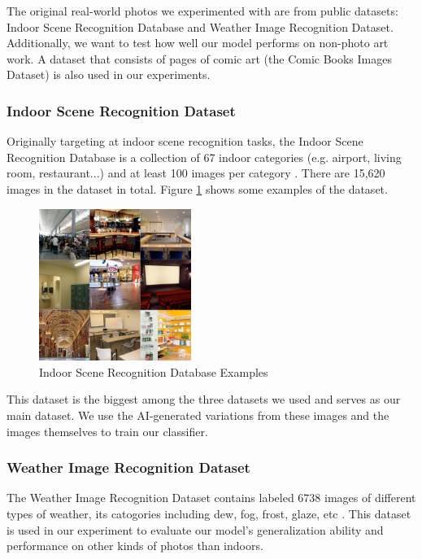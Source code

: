 \documentclass[11pt]{article}
\begin{document}
The original real-world photos we experimented with are from public datasets: Indoor Scene Recognition Database and Weather Image Recognition Dataset. Additionally, we want to test how well our model performs on non-photo art work. A dataset that consists of pages of comic art (the Comic Books Images Dataset) is also used in our experiments.

\subsubsection{Indoor Scene Recognition Dataset}
\label{sec:indoor_dataset}

Originally targeting at indoor scene recognition tasks, the Indoor Scene Recognition Database is a collection of 67 indoor categories (e.g. airport, living room, restaurant...) and at least 100 images per category \cite{quattoni2009recognizing}. There are 15,620 images in the dataset in total. Figure \ref{fig:paper_indoor_dataset} shows some examples of the dataset.

\begin{figure}[ht]
  \centering
  \includegraphics[width=140pt]{./assets/paper_indoor_dataset.jpg}
  \caption{Indoor Scene Recognition Database Examples}
  \label{fig:paper_indoor_dataset}
\end{figure}

This dataset is the biggest among the three datasets we used and serves as our main dataset. We use the AI-generated variations from these images and the images themselves to train our classifier.

\subsubsection{Weather Image Recognition Dataset}
\label{sec:weather_dataset}

The Weather Image Recognition Dataset contains labeled 6738 images of different types of weather, its catogories including dew, fog, frost, glaze, etc \cite{haixia2021weather}. This dataset is used in our experiment to evaluate our model's generalization ability and performance on other kinds of photos than indoors.
\end{document}
